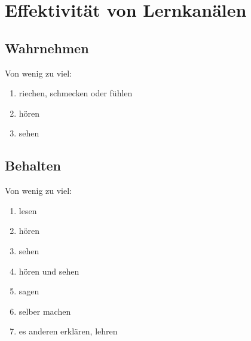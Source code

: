 \section{Effektivität von Lernkanälen}
\subsection{Wahrnehmen}
Von wenig zu viel:
\begin{enumerate}
  \item riechen, schmecken oder fühlen
  \item hören
  \item sehen
\end{enumerate}

\subsection{Behalten}
Von wenig zu viel:
\begin{enumerate}
  \item lesen
  \item hören
  \item sehen
  \item hören und sehen
  \item sagen
  \item selber machen
  \item es anderen erklären, lehren
\end{enumerate}
